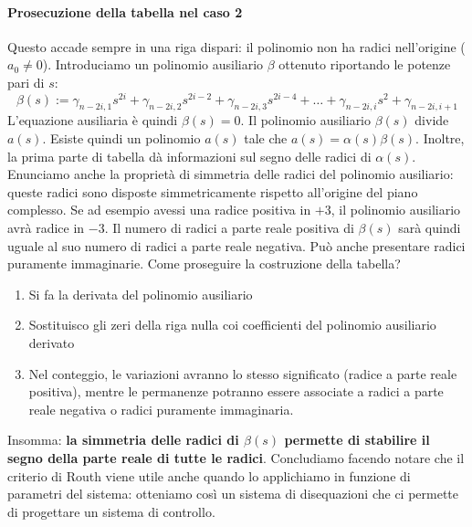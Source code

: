 \documentclass[11pt]{article}
\begin{document}
\paragraph{Prosecuzione della tabella nel caso 2} Questo accade sempre in una riga dispari: il polinomio non ha radici nell'origine ($a_0 \neq 0$). Introduciamo un polinomio ausiliario $\beta$ ottenuto riportando le potenze pari di $s$:
\begin{displaymath}
    \beta(s) := \gamma_{n-2i,1}s^{2i}+\gamma_{n-2i,2}s^{2i-2}+\gamma_{n-2i,3}s^{2i-4}+\dots+\gamma_{n-2i,i}s^{2}+\gamma_{n-2i,i+1}
\end{displaymath}
L'equazione ausiliaria è quindi $\beta(s) = 0$.
Il polinomio ausiliario $\beta(s)$ divide $a(s)$. Esiste quindi un polinomio $a(s)$ tale che $a(s) = \alpha(s)\beta(s)$. Inoltre, la prima parte di tabella dà informazioni sul segno delle radici di $\alpha(s)$. Enunciamo anche la proprietà di simmetria delle radici del polinomio ausiliario: queste radici sono disposte simmetricamente rispetto all'origine del piano complesso. Se ad esempio avessi una radice positiva in $+3$, il polinomio ausiliario avrà radice in $-3$. Il numero di radici a parte reale positiva di $\beta(s)$ sarà quindi uguale al suo numero di radici a parte reale negativa. Può anche presentare radici puramente immaginarie. Come proseguire la costruzione della tabella?
\begin{enumerate}
    \item Si fa la derivata del polinomio ausiliario
    \item Sostituisco gli zeri della riga nulla coi coefficienti del polinomio ausiliario derivato
    \item Nel conteggio, le variazioni avranno lo stesso significato (radice a parte reale positiva), mentre le permanenze potranno essere associate a radici a parte reale negativa o radici puramente immaginaria.
\end{enumerate}
Insomma: \textbf{la simmetria delle radici di $\beta(s)$ permette di stabilire il segno della parte reale di tutte le radici}.
Concludiamo facendo notare che il criterio di Routh viene utile anche quando lo applichiamo in funzione di parametri del sistema: otteniamo così un sistema di disequazioni che ci permette di progettare un sistema di controllo.
\end{document}

